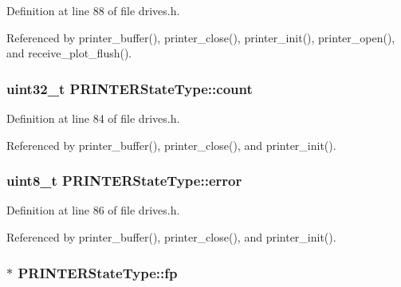 Definition at line 88 of file drives.\+h.



Referenced by printer\+\_\+buffer(), printer\+\_\+close(), printer\+\_\+init(), printer\+\_\+open(), and receive\+\_\+plot\+\_\+flush().

\subsubsection[{\texorpdfstring{count}{count}}]{\setlength{\rightskip}{0pt plus 5cm}uint32\+\_\+t P\+R\+I\+N\+T\+E\+R\+State\+Type\+::count}\hypertarget{structPRINTERStateType_ae115fc351910f3801e37b31f254fb8f4}{}\label{structPRINTERStateType_ae115fc351910f3801e37b31f254fb8f4}


Definition at line 84 of file drives.\+h.



Referenced by printer\+\_\+buffer(), printer\+\_\+close(), and printer\+\_\+init().

\subsubsection[{\texorpdfstring{error}{error}}]{\setlength{\rightskip}{0pt plus 5cm}uint8\+\_\+t P\+R\+I\+N\+T\+E\+R\+State\+Type\+::error}\hypertarget{structPRINTERStateType_a6e5b550f5396901febd5475445132dd0}{}\label{structPRINTERStateType_a6e5b550f5396901febd5475445132dd0}


Definition at line 86 of file drives.\+h.



Referenced by printer\+\_\+buffer(), printer\+\_\+close(), and printer\+\_\+init().

\subsubsection[{\texorpdfstring{fp}{fp}}]{$\ast$ P\+R\+I\+N\+T\+E\+R\+State\+Type\+::fp}\hypertarget{structPRINTERStateType_a791c78d68d169f9d2e60d34b890e520a}{}\label{structPRINTERStateType_a791c78d68d169f9d2e60d34b890e520a}


